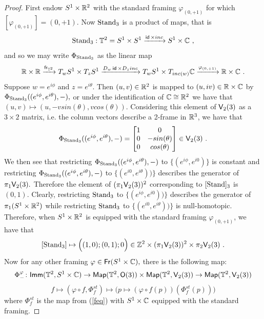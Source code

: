 \begin{proof}
First endow $S^{1} \times \mathbb R^{2}$ with the standard framing $\varphi_{(0, +1)}$ for which $[\varphi_{(0, +1)}] = (0, +1).$
Now ${\rm Stand}_{3}$ is a product of maps, that is 
\[
{\rm Stand}_{3}: \mathbb T^{2} = S^1 \times S^1 \xrightarrow{\operatorname{\sf id} \times inc} S^1 \times \mathbb C~,
\]
and so we may write $\Phi_{\rm Stand_{3}}$ as the linear map
\[
\mathbb R \times \mathbb R \xrightarrow{{\sf fr}_{\mathbb T^{2}}}T_{w}S^1 \times T_{z}S^1 \xrightarrow{D_{w}\operatorname{\sf id} \times D_{z}inc} T_{w}S^1 \times T_{inc(w)}\mathbb C \xrightarrow{\varphi_{(0, +1)}} \mathbb R \times \mathbb C~.
\]
Suppose $w = e^{i\phi}$ and $z = e^{i\theta}.$ Then $(u, v) \in \mathbb R^{2}$ is mapped to $(u, iv) \in \mathbb R \times \mathbb C$ by $\Phi_{\rm Stand_{3}}((e^{i\phi}, e^{i\theta}), -),$ or under the identification of $\mathbb C \cong \mathbb R^{2}$ we have that $(u, v) \mapsto (u, -vsin(\theta), vcos(\theta)).$ Considering this element of $\mathsf V_{2}(3)$ as a $3 \times 2$ matrix, i.e. the column vectors describe a 2-frame in $\mathbb R^{3}$, we have that \[
\Phi_{\rm Stand_{3}}((e^{i\phi}, e^{i\theta}), -) = \begin{bmatrix} 1 & 0 \\ 0 & -sin(\theta) \\ 0 & cos(\theta) \end{bmatrix} \in \mathsf V_{2}(3)~.
\]
We then see that restricting $\Phi_{\rm Stand_{3}}((e^{i\phi}, e^{i\theta}), -)$ to $\{(e^{i\phi}, e^{i0})\}$ is constant and restricting $\Phi_{\rm Stand_{3}}((e^{i\phi}, e^{i\theta}), -)$ to $\{(e^{i0}, e^{i\theta}))\}$ describes the generator of $\pi_{1}\mathsf V_{2}(3).$ Therefore the element of $(\pi_{1}\mathsf V_{2}(3))^{2}$ corresponding to $[\rm Stand]_{3}$ is $(0, 1).$ 
Clearly, restricting ${\rm Stand}_{3}$ to  $\{(e^{i\phi}, e^{i0}))\}$ describes the generator of $\pi_{1}(S^1 \times \mathbb R^{2})$ while restricting  ${\rm Stand}_{3}$ to  $\{(e^{i0}, e^{i\theta}))\}$ is null-homotopic. Therefore, when $S^1 \times \mathbb R^{2}$ is equipped with the standard framing $\varphi_{(0, +1)}$, we have that  \[
[{\rm  Stand}_{3}] \mapsto \Bigl((1, 0); (0, 1) ; 0 \Bigr) \in \mathbb Z^{2} \times (\pi_{1}\mathsf V_{2}(3))^{2} \times \pi_{2}\mathsf V_{2}(3)~.
\]
Now for any other framing $\varphi \in \operatorname{\sf Fr}(S^1\times \mathbb C),$ there is the following map:
\begin{equation}\label{eqqq}
\Phi^{\varphi}_{-} \colon {\sf Imm}(\mathbb T^{2}, S^1 \times \mathbb C) \rightarrow {\sf Map}(\mathbb T^{2}, \mathsf O(3)) \times {\sf Map}(\mathbb T^{2}, \mathsf V_{2}(3)) \rightarrow {\sf Map}(\mathbb T^{2}, \mathsf V_{2}(3))
\end{equation}
\[
f \mapsto (\varphi \circ f, \Phi^{st}_{f}) \mapsto \Big(p \mapsto (\varphi \circ f(p)) (\Phi^{st}_{f}(p))\Big)
\]
where $\Phi^{st}_{f}$ is the map from (\ref{feq}) with $S^{1} \times \mathbb C$ equipped with the standard framing.

\end{proof}
